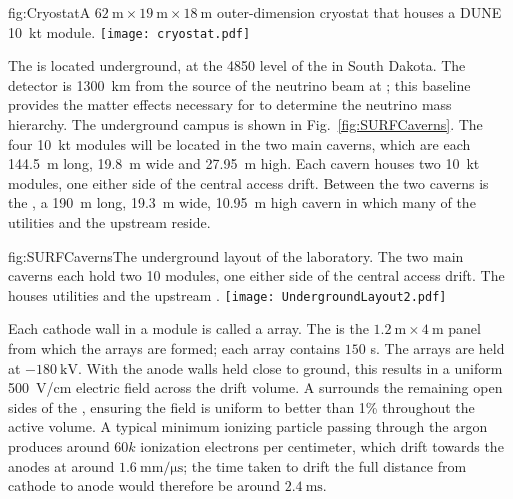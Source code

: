 \begin{dunefigure}{fig:Cryostat}{A $\SI{62}{\meter}\times \SI{19}{\meter}\times \SI{18}{\meter}$ outer-dimension cryostat that houses a DUNE \SI{10}{\kilo\tonne} module.}
\texttt{[image: cryostat.pdf]}
\end{dunefigure}

The  is located underground, at the \SI{4850}{\foot} level of the  in South Dakota. The detector is \SI{1300}{\km} from the source of the  neutrino beam at ; this baseline provides the matter effects necessary for  to determine the neutrino mass hierarchy. The  underground campus is shown in Fig.~\ref{fig:SURFCaverns}. The four \SI{10}{\kilo\tonne}  modules will be located in the two main caverns, which are each \SI{144.5}{\meter} long, \SI{19.8}{\meter} wide and \SI{27.95}{\meter} high. Each cavern houses two \SI{10}{\kilo\tonne} modules, one either side of the central access drift. Between the two caverns is the , a \SI{190}{\meter} long, \SI{19.3}{\meter} wide, \SI{10.95}{\meter} high cavern in which many of the utilities and the upstream  reside.

\begin{dunefigure}{fig:SURFCaverns}{The underground layout of the  laboratory. The two main caverns each hold two \SI{10}{\kt}  modules, one either side of the central access drift. The  houses utilities and the upstream .}
\texttt{[image: UndergroundLayout2.pdf]}
\end{dunefigure}

Each cathode wall in a module is called a  array. The  is the $\SI{1.2}{\meter}\times\SI{4}{\meter}$ panel from which the  arrays are formed; each  array contains $150$ s. The  arrays are held at $-\SI{180}{\kilo\volt}$. With the anode walls held close to ground, this results in a uniform \SI{500}{\volt/\centi\meter} electric field across the drift volume. A  surrounds the remaining open sides of the , ensuring the field is uniform to better than 1\% throughout the active volume. A typical minimum ionizing particle passing through the argon produces around $60k$ ionization electrons per centimeter, which drift towards the anodes at around $\SI{1.6}{\mm/\micro\second}$; the time taken to drift the full distance from cathode to anode would therefore be around $\SI{2.4}{\milli\second}$.

